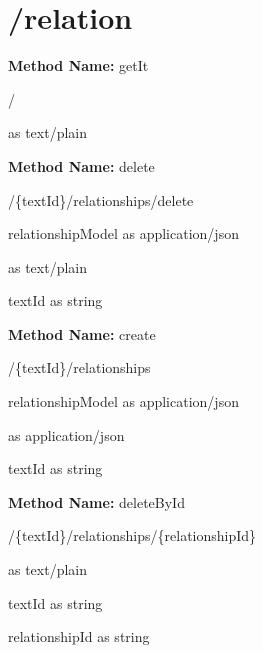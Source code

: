 \section{/relation}
\textbf{Method Name: }getIt
\begin{get}
/
\end{get}
\begin{response}
 as text/plain
\end{response}
\textbf{Method Name: }delete
\begin{post}
/\{textId\}/relationships/delete
\end{post}
\begin{request}
relationshipModel as application/json
\end{request}
\begin{response}
 as text/plain
\end{response}
\begin{parameter}
textId as string
\end{parameter}
\textbf{Method Name: }create
\begin{post}
/\{textId\}/relationships
\end{post}
\begin{request}
relationshipModel as application/json
\end{request}
\begin{response}
 as application/json
\end{response}
\begin{parameter}
textId as string
\end{parameter}
\textbf{Method Name: }deleteById
\begin{delete}
/\{textId\}/relationships/\{relationshipId\}
\end{delete}
\begin{response}
 as text/plain
\end{response}
\begin{parameter}
textId as string
\end{parameter}
\begin{parameter}
relationshipId as string
\end{parameter}
